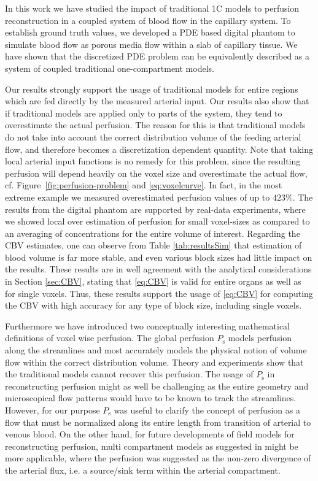 \documentclass[journal,twocolumn]{IEEEtran}
\newcommand{\Perfs}{P_{\mathrm{s}}}
\begin{document}
	In this work we have studied the impact of traditional 1C models to perfusion reconstruction in a coupled system of blood flow in the capillary system.
	To establish ground truth values, we developed a PDE based digital phantom to simulate blood flow as porous media flow within a slab of capillary tissue.
	We have shown that the discretized PDE problem can be equivalently described as a system of coupled traditional one-compartment models.
	
	
	
	
	Our results strongly support the usage of traditional models for entire regions which are fed directly by the measured arterial input.
	Our results also show that if traditional models are applied only to parts of the system, they tend to overestimate the actual perfusion. The reason for this is that traditional models do not take into account the correct distribution volume of the feeding arterial flow, and therefore becomes a discretization dependent quantity.
	Note that taking local arterial input functions is no remedy for this problem, since the resulting perfusion will depend heavily on the voxel size and overestimate the actual flow, cf. Figure~\ref{fig:perfusion-problem} and \eqref{eq:voxelcurve}.
	In fact, in the most extreme example we measured overestimated perfusion values of up to $423\%$.
	The results from the digital phantom are supported by real-data experiments, where we showed local over estimation of perfusion for small voxel-sizes as compared to an averaging of concentrations for the entire volume of interest.
	Regarding the CBV estimates, one can observe from Table \ref{tab:resultsSim} that estimation of blood volume is far more stable, and  
	even various block sizes had little impact on the results. 
	These results are in well agreement with the analytical considerations in Section \ref{sec:CBV}, stating that \eqref{eq:CBV} is valid for entire organs as well as for single voxels. 
	Thus, these results support the usage of \eqref{eq:CBV} for computing the CBV with high accuracy for any type of block size, including single voxels.



	Furthermore we have introduced two conceptually interesting mathematical definitions of voxel wise perfusion.
	The global perfusion $\Perfs$ models perfusion along the streamlines and most accurately models the physical notion of volume flow within the correct distribution volume.
	Theory and experiments show that the traditional models cannot recover this perfusion. The usage of $\Perfs$ in reconstructing perfusion might as well be challenging as the entire geometry and microscopical flow patterns would have to be known to track the streamlines. However, for our purpose $\Perfs$ was useful to clarify the concept of perfusion as a flow that must be normalized along its entire length from transition of arterial to venous blood. On the other hand, for future developments of field models for reconstructing perfusion, multi compartment models as suggested in \cite{sourbron14} might be more applicable, where the perfusion was suggested as the non-zero divergence of the arterial flux, i.e. a source/sink term within the arterial compartment.
	
\end{document}
